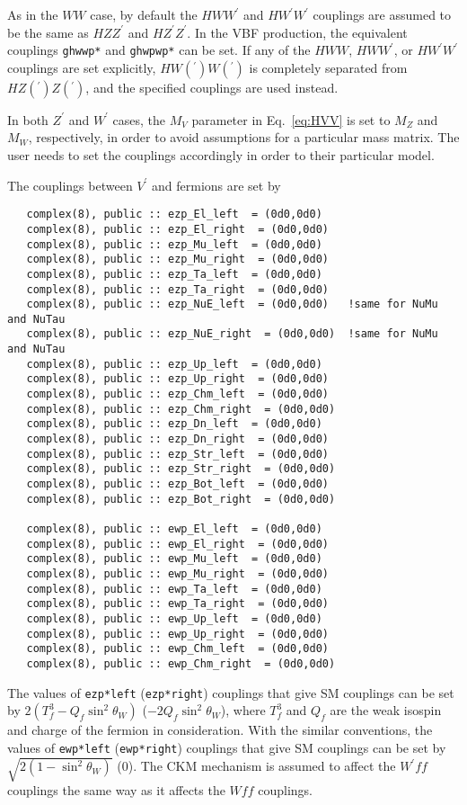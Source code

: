 \documentclass[aps,superscriptaddress,nofootinbib]{revtex4}
\begin{document}
As in the $WW$ case, by default the $HWW^\prime$ and $HW^\prime W^\prime$ couplings are assumed to be the same as $HZZ^\prime$ and $HZ^\prime Z^\prime$.  In the VBF production, the equivalent couplings \verb|ghwwp*| and \verb|ghwpwp*| can be set.  If any of the $HWW$, $HWW^\prime$, or $HW^\prime W^\prime$ couplings are set explicitly, $HW({}^\prime)W(^{\prime})$ is completely separated from $HZ({}^\prime)Z(^{\prime})$, and the specified couplings are used instead.

In both $Z^\prime$ and $W^\prime$ cases, the $M_V$ parameter in Eq.~\ref{eq:HVV} is set to $M_Z$ and $M_W$, respectively, in order to avoid assumptions for a particular mass matrix. The user needs to set the couplings accordingly in order to their particular model.

The couplings between $V^\prime$ and fermions are set by
\begin{verbatim}
   complex(8), public :: ezp_El_left  = (0d0,0d0)
   complex(8), public :: ezp_El_right  = (0d0,0d0)
   complex(8), public :: ezp_Mu_left  = (0d0,0d0)
   complex(8), public :: ezp_Mu_right  = (0d0,0d0)
   complex(8), public :: ezp_Ta_left  = (0d0,0d0)
   complex(8), public :: ezp_Ta_right  = (0d0,0d0)
   complex(8), public :: ezp_NuE_left  = (0d0,0d0)   !same for NuMu and NuTau
   complex(8), public :: ezp_NuE_right  = (0d0,0d0)  !same for NuMu and NuTau
   complex(8), public :: ezp_Up_left  = (0d0,0d0)
   complex(8), public :: ezp_Up_right  = (0d0,0d0)
   complex(8), public :: ezp_Chm_left  = (0d0,0d0)
   complex(8), public :: ezp_Chm_right  = (0d0,0d0)
   complex(8), public :: ezp_Dn_left  = (0d0,0d0)
   complex(8), public :: ezp_Dn_right  = (0d0,0d0)
   complex(8), public :: ezp_Str_left  = (0d0,0d0)
   complex(8), public :: ezp_Str_right  = (0d0,0d0)
   complex(8), public :: ezp_Bot_left  = (0d0,0d0)
   complex(8), public :: ezp_Bot_right  = (0d0,0d0)

   complex(8), public :: ewp_El_left  = (0d0,0d0)
   complex(8), public :: ewp_El_right  = (0d0,0d0)
   complex(8), public :: ewp_Mu_left  = (0d0,0d0)
   complex(8), public :: ewp_Mu_right  = (0d0,0d0)
   complex(8), public :: ewp_Ta_left  = (0d0,0d0)
   complex(8), public :: ewp_Ta_right  = (0d0,0d0)
   complex(8), public :: ewp_Up_left  = (0d0,0d0)
   complex(8), public :: ewp_Up_right  = (0d0,0d0)
   complex(8), public :: ewp_Chm_left  = (0d0,0d0)
   complex(8), public :: ewp_Chm_right  = (0d0,0d0)
\end{verbatim}

The values of \verb|ezp*left| (\verb|ezp*right|) couplings that give SM couplings can be set by $2 \left(T^{3}_{f}-Q_{f} \sin^2 \theta_{W}\right)$ ($-2 Q_{f} \sin^2 \theta_{W}$), where $T^{3}_{f}$ and $Q_{f}$ are the weak isospin and charge of the fermion in consideration. 
With the similar conventions, the values of \verb|ewp*left| (\verb|ewp*right|) couplings that give SM couplings can be set by $\sqrt{2 \left(1-\sin^2 \theta_{W}\right)}$ ($0$).
The CKM mechanism is assumed to affect the $W^\prime ff$ couplings the same way as it affects the $Wff$ couplings.
\end{document}
